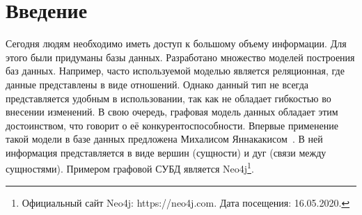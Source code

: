 \documentclass[14pt]{matmex-diploma}
\theoremstyle{definition}
\begin{document}

\maketitle
\tableofcontents
\section*{Введение}
Сегодня людям необходимо иметь доступ к большому объему информации. Для этого были придуманы базы данных. Разработано множество моделей построения баз данных. Например, часто используемой моделью является реляционная, где данные представлены в виде отношений. Однако данный тип не всегда представляется удобным в использовании, так как не обладает гибкостью во внесении изменений. В свою очередь, графовая модель данных обладает этим достоинством, что говорит о её конкурентоспособности. Впервые применение такой модели в базе данных предложена Михалисом Яннакакисом~\cite{firstGDB}. В ней информация представляется в виде вершин (сущности) и дуг (связи между сущностями). Примером графовой СУБД является Neo4j\footnote{Официальный сайт Neo4j: https://neo4j.com. Дата посещения: 16.05.2020.}.
\end{document}
